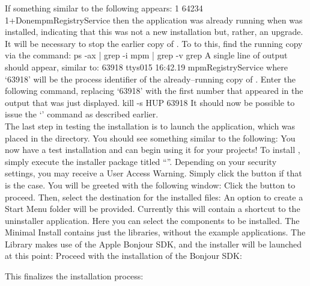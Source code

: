 If something similar to the following appears:
\outputBegin{}
\openSq{}1\closeSq{} 64234\\
\openSq{}1\closeSq{}+\hspace*{1em}Done\hspace*{8em}mpmRegistryService
\outputEnd{}
then the  application was already running when \mplusm{} was
installed, indicating that this was not a new installation but, rather, an upgrade.\\

It will be necessary to stop the earlier copy of .
To to this, find the running copy via the command:
\outputBegin{}
ps -ax | grep -i mpm | grep -v grep
\outputEnd{}
A single line of output should appear, similar to:
\outputBegin{}
63918 ttys015   16:42.19 mpmRegistryService
\outputEnd{}
where `63918' will be the process identifier of the already--running copy of
.
Enter the following command, replacing `63918' with the first number that appeared in the
output that was just displayed.
\outputBegin{}
kill -s HUP 63918
\outputEnd{}
It should now be possible to issue the `' command as
described earlier.\\

The last step in testing the \mplusm{} installation is to launch the
 application, which was placed in the 
directory.
You should see something similar to the following:
You now have a test \mplusm{} installation and can begin using it for your projects!
\tertiaryEnd{}
\secondaryEnd{}
\newpage
{}
To install \mplusm, simply execute the installer package titled
``''.
Depending on your security settings, you may receive a User Access Warning.
Simply click the  button if that is the case.
You will be greeted with the following window:
Click the  button to proceed.
\newpage
Then, select the destination for the installed files:
An option to create a Start Menu folder will be provided.
Currently this will contain a shortcut to the uninstaller application.
\newpage
Here you can select the components to be installed.
The Minimal Install contains just the libraries, without the example applications.
The \mplusm{} Library makes use of the Apple Bonjour SDK, and the installer will be
launched at this point:
\newpage
Proceed with the installation of the Bonjour SDK:


\newpage



\newpage
This finalizes the installation process:
\secondaryEnd{}
\primaryEnd{}

